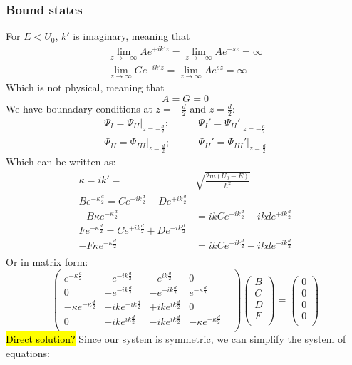 		\subsubsection{Bound states}
			For $E < U_0$, $k'$ is imaginary, meaning that
			\begin{align}
				\lim_{z \to -\infty} Ae^{+ik'z} = \lim_{z \to -\infty} Ae^{-sz} = \infty \\
				\lim_{z \to \infty} Ge^{-ik'z} = \lim_{z \to \infty} Ae^{sz} = \infty
			\end{align}
			Which is not physical, meaning that 
			\begin{equation}
				A = G = 0
			\end{equation}
			We have bounadary conditions at $z = -\frac{d}{2}$ and $z = \frac{d}{2}$:
			\begin{align}
				\Psi_I = \Psi_{II}|_{z=-\frac{d}{2}};&\qquad  \Psi_I' = \Psi_{II}'|_{z=-\frac{d}{2}} \\
				\Psi_{II} = \Psi_{III}|_{z=\frac{d}{2}};&\qquad  \Psi_{II}' = \Psi_{III}'|_{z=\frac{d}{2}}
			\end{align}
			Which can be written as:
			\begin{align}
				\kappa = ik' =& \sqrt{\frac{2m(U_0-E)}{\hbar^2}} \\
				Be^{-\kappa\frac{d}{2}} = Ce^{-ik\frac{d}{2}} + De^{+ik\frac{d}{2}}&\\
				-B\kappa e^{-\kappa\frac{d}{2}} &= ikCe^{-ik\frac{d}{2}} - ikde^{+ik\frac{d}{2}}\\
				Fe^{-\kappa\frac{d}{2}} = Ce^{+ik\frac{d}{2}} + De^{-ik\frac{d}{2}}&\\
				-F\kappa e^{-\kappa\frac{d}{2}} &= ikCe^{+ik\frac{d}{2}} - ikde^{-ik\frac{d}{2}}\\
			\end{align}
			Or in matrix form:
			\begin{equation}
				\begin{pmatrix}
				e^{-\kappa\frac{d}{2}}			&	-e^{-ik\frac{d}{2}}	&	-e^{ik\frac{d}{2}}	&	0 \\ 
				0	&	-e^{-ik\frac{d}{2}}	&	-e^{-ik\frac{d}{2}}	&	e^{-\kappa \frac{d}{2}} \\
				-\kappa e^{-\kappa \frac{d}{2}}	& -ike^{-ik\frac{d}{2}}	& +ike^{ik\frac{d}{2}}	& 0 \\
				0	& +ike^{ik\frac{d}{2}}	& -ike^{ik\frac{d}{2}}	& 	-\kappa e^{-\kappa\frac{d}{2}}	& \\
				\end{pmatrix}
				\begin{pmatrix}
				B \\
				C \\
				D \\
				F \\
				\end{pmatrix}
				=
				\begin{pmatrix}
				0 \\
				0 \\
				0 \\
				0 \\
				\end{pmatrix}			
			\end{equation}
			\hl{Direct solution?}
			Since our system is symmetric, we can simplify the system of equations:
			
